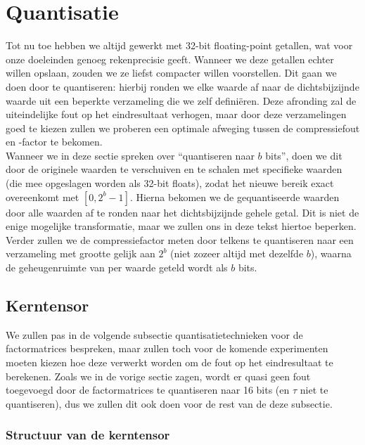 \section{Quantisatie}
\label{sec:quantisatie}

Tot nu toe hebben we altijd gewerkt met 32-bit floating-point getallen, wat voor onze doeleinden genoeg rekenprecisie geeft. Wanneer we deze getallen echter willen opslaan, zouden we ze liefst compacter willen voorstellen. Dit gaan we doen door te quantiseren: hierbij ronden we elke waarde af naar de dichtsbijzijnde waarde uit een beperkte verzameling die we zelf defini\"eren. Deze afronding zal de uiteindelijke fout op het eindresultaat verhogen, maar door deze verzamelingen goed te kiezen zullen we proberen een optimale afweging tussen de compressiefout en -factor te bekomen.\\

Wanneer we in deze sectie spreken over ``quantiseren naar $b$ bits'', doen we dit door de originele waarden te verschuiven en te schalen met specifieke waarden (die mee opgeslagen worden als 32-bit floats), zodat het nieuwe bereik exact overeenkomt met $[0, 2^b - 1]$. Hierna bekomen we de gequantiseerde waarden door alle waarden af te ronden naar het dichtsbijzijnde gehele getal. Dit is niet de enige mogelijke transformatie, maar we zullen ons in deze tekst hiertoe beperken. Verder zullen we de compressiefactor meten door telkens te quantiseren naar een verzameling met grootte gelijk aan $2^b$ (niet zozeer altijd met dezelfde $b$), waarna de geheugenruimte van per waarde geteld wordt als $b$ bits. 

\subsection{Kerntensor}

We zullen pas in de volgende subsectie quantisatietechnieken voor de factormatrices bespreken, maar zullen toch voor de komende experimenten moeten kiezen hoe deze verwerkt worden om de fout op het eindresultaat te berekenen. Zoals we in de vorige sectie zagen, wordt er quasi geen fout toegevoegd door de factormatrices te quantiseren naar 16 bits (en $\tau$ niet te quantiseren), dus we zullen dit ook doen voor de rest van de deze subsectie.

\subsubsection{Structuur van de kerntensor}

